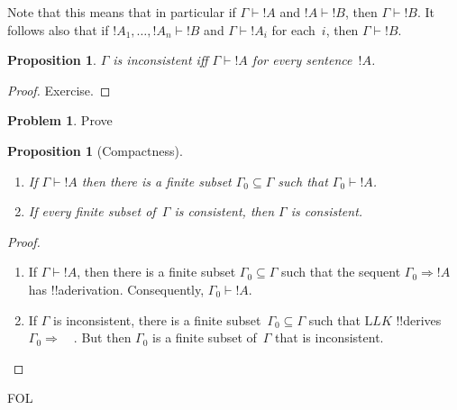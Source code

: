 \documentclass[10pt,a4paper]{article}
\makeatletter
\theoremstyle{plain}
\newtheorem{prop}[thm]{Proposition}
\theoremstyle{definition}
\newtheorem{prob}{Problem}[section]
\theoremstyle{remark}
\newcommand*{\olfileid}[3]{}
\newcommand*{\ollabel}[1]{\label{#1}}
\newcommand{\olref}{\@ifnextchar[{\olref@i}{\olref@final}}
\def\olref@i[#1]{\@ifnextchar[{\olref@ii}{\olref@final}}
\def\olref@ii[#1]{\@ifnextchar[{\olref@iii}{\olref@final}}
\def\olref@iii[#1]{\olref@final}
\def\olref@final#1{\ref{#1}}
\providecommand{\Sequent}{\mathrel{\Rightarrow}}
\providecommand{\Proves}{\mathrel{\vdash}}
\providecommand{\Log}{\ensuremath{\mathrm{L}}}
\providecommand{\iftag}[1]{#1}
\makeatother
\begin{document}
Note that this means that in particular if $\Gamma \Proves !A$ and $!A
\Proves !B$, then $\Gamma \Proves !B$. It follows also that if $!A_1,
\dots, !A_n \Proves !B$ and $\Gamma \Proves !A_i$ for each~$i$, then
$\Gamma \Proves !B$.

\begin{prop}
\ollabel{prop:incons}
$\Gamma$ is inconsistent iff $\Gamma \Proves {!A}$ for every
  sentence~$!A$.
\end{prop}

\begin{proof}
Exercise.
\end{proof}

\begin{prob}
Prove \olref[fol][seq][ptn]{prop:incons}
\end{prob}

\begin{prop}[Compactness]
  \ollabel{prop:proves-compact}
  \begin{enumerate}
  \item If $\Gamma \Proves !A$ then there is a finite subset $\Gamma_0
    \subseteq \Gamma$ such that $\Gamma_0 \Proves !A$.
  \item If every finite subset of~$\Gamma$ is
    consistent, then $\Gamma$ is consistent.
  \end{enumerate}
\end{prop}

\begin{proof}
  \begin{enumerate}
    \item If $\Gamma \Proves !A$, then there is a finite subset
      $\Gamma_0 \subseteq \Gamma$ such that the sequent $\Gamma_0
      \Sequent !A$ has !!a{derivation}. Consequently, $\Gamma_0
      \Proves !A$.
    \item If $\Gamma$ is inconsistent, there is a finite
      subset~$\Gamma_0 \subseteq \Gamma$ such that $\Log{LK}$
      !!{derive}s $\Gamma_0 \Sequent \quad$. But then $\Gamma_0$ is a
      finite subset of~$\Gamma$ that is inconsistent.
  \end{enumerate}
\end{proof}





\iftag{FOL}
      {\olfileid{fol}{seq}{prl}}
      {\olfileid{pl}{seq}{prl}}
\end{document}
